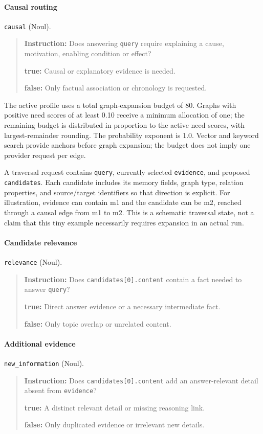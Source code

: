 \documentclass[11pt]{article}
\begin{document}
\paragraph{Causal routing} \texttt{causal} (Noul).
\begin{quote}\small
\noindent\textbf{Instruction:} Does answering \texttt{query} require explaining a cause, motivation, enabling condition or effect?\par
\noindent\textbf{true:} Causal or explanatory evidence is needed.\par
\noindent\textbf{false:} Only factual association or chronology is requested.\par
\end{quote}

The active profile uses a total graph-expansion budget of 80. Graphs with positive need scores of at least 0.10 receive a minimum allocation of one; the remaining budget is distributed in proportion to the active need scores, with largest-remainder rounding. The probability exponent is 1.0. Vector and keyword search provide anchors before graph expansion; the budget does not imply one provider request per edge.

A traversal request contains \texttt{query}, currently selected \texttt{evidence}, and proposed \texttt{candidates}. Each candidate includes its memory fields, graph type, relation properties, and source/target identifiers so that direction is explicit. For illustration, evidence can contain m1 and the candidate can be m2, reached through a causal edge from m1 to m2. This is a schematic traversal state, not a claim that this tiny example necessarily requires expansion in an actual run.

\paragraph{Candidate relevance} \texttt{relevance} (Noul).
\begin{quote}\small
\noindent\textbf{Instruction:} Does \texttt{candidates[0].content} contain a fact needed to answer \texttt{query}?\par
\noindent\textbf{true:} Direct answer evidence or a necessary intermediate fact.\par
\noindent\textbf{false:} Only topic overlap or unrelated content.\par
\end{quote}

\paragraph{Additional evidence} \texttt{new\_information} (Noul).
\begin{quote}\small
\noindent\textbf{Instruction:} Does \texttt{candidates[0].content} add an answer-relevant detail absent from \texttt{evidence}?\par
\noindent\textbf{true:} A distinct relevant detail or missing reasoning link.\par
\noindent\textbf{false:} Only duplicated evidence or irrelevant new details.\par
\end{quote}
\end{document}
